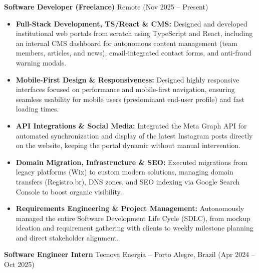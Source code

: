 \documentclass[10pt, letterpaper]{article}
\begin{document}
\textbf{Software Developer (Freelance)} \hfill Remote \hfill (Nov 2025 -- Present)

\begin{itemize}
    \item \textbf{Full-Stack Development, TS/React \& CMS:} Designed and developed institutional web portals from scratch using TypeScript and React, including an internal CMS dashboard for autonomous content management (team members, articles, and news), email-integrated contact forms, and anti-fraud warning modals.

    \item \textbf{Mobile-First Design \& Responsiveness:} Designed highly responsive interfaces focused on performance and mobile-first navigation, ensuring seamless usability for mobile users (predominant end-user profile) and fast loading times.

    \item \textbf{API Integrations \& Social Media:} Integrated the Meta Graph API for automated synchronization and display of the latest Instagram posts directly on the website, keeping the portal dynamic without manual intervention.

    \item \textbf{Domain Migration, Infrastructure \& SEO:} Executed migrations from legacy platforms (Wix) to custom modern solutions, managing domain transfers (Registro.br), DNS zones, and SEO indexing via Google Search Console to boost organic visibility.

    \item \textbf{Requirements Engineering \& Project Management:} Autonomously managed the entire Software Development Life Cycle (SDLC), from mockup ideation and requirement gathering with clients to weekly milestone planning and direct stakeholder alignment.
\end{itemize}

\textbf{Software Engineer Intern} \hfill Tecnova Energia -- Porto Alegre, Brazil \hfill (Apr 2024 -- Oct 2025)
\end{document}
